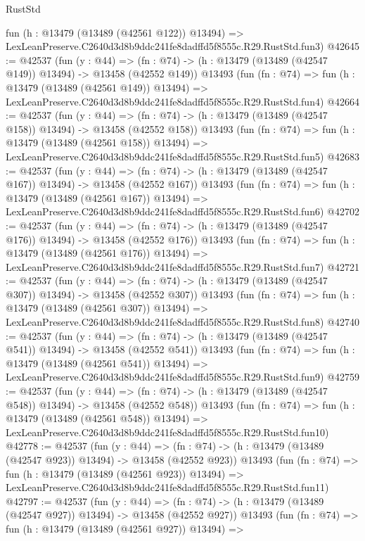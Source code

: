 \begin{lexlean}{RustStd}
\begin{coremodule}
    fun (h : @13479 (@13489 (@42561 @122)) @13494) =>
    LexLeanPreserve.C2640d3d8b9ddc241fe8dadffd5f8555c.R29.RustStd.fun3)
@42645 := @42537
    (fun (y : @44) =>
    (fn : @74) -> (h : @13479 (@13489 (@42547 @149)) @13494) -> @13458 (@42552 @149))
    @13493
    (fun (fn : @74) =>
    fun (h : @13479 (@13489 (@42561 @149)) @13494) =>
    LexLeanPreserve.C2640d3d8b9ddc241fe8dadffd5f8555c.R29.RustStd.fun4)
@42664 := @42537
    (fun (y : @44) =>
    (fn : @74) -> (h : @13479 (@13489 (@42547 @158)) @13494) -> @13458 (@42552 @158))
    @13493
    (fun (fn : @74) =>
    fun (h : @13479 (@13489 (@42561 @158)) @13494) =>
    LexLeanPreserve.C2640d3d8b9ddc241fe8dadffd5f8555c.R29.RustStd.fun5)
@42683 := @42537
    (fun (y : @44) =>
    (fn : @74) -> (h : @13479 (@13489 (@42547 @167)) @13494) -> @13458 (@42552 @167))
    @13493
    (fun (fn : @74) =>
    fun (h : @13479 (@13489 (@42561 @167)) @13494) =>
    LexLeanPreserve.C2640d3d8b9ddc241fe8dadffd5f8555c.R29.RustStd.fun6)
@42702 := @42537
    (fun (y : @44) =>
    (fn : @74) -> (h : @13479 (@13489 (@42547 @176)) @13494) -> @13458 (@42552 @176))
    @13493
    (fun (fn : @74) =>
    fun (h : @13479 (@13489 (@42561 @176)) @13494) =>
    LexLeanPreserve.C2640d3d8b9ddc241fe8dadffd5f8555c.R29.RustStd.fun7)
@42721 := @42537
    (fun (y : @44) =>
    (fn : @74) -> (h : @13479 (@13489 (@42547 @307)) @13494) -> @13458 (@42552 @307))
    @13493
    (fun (fn : @74) =>
    fun (h : @13479 (@13489 (@42561 @307)) @13494) =>
    LexLeanPreserve.C2640d3d8b9ddc241fe8dadffd5f8555c.R29.RustStd.fun8)
@42740 := @42537
    (fun (y : @44) =>
    (fn : @74) -> (h : @13479 (@13489 (@42547 @541)) @13494) -> @13458 (@42552 @541))
    @13493
    (fun (fn : @74) =>
    fun (h : @13479 (@13489 (@42561 @541)) @13494) =>
    LexLeanPreserve.C2640d3d8b9ddc241fe8dadffd5f8555c.R29.RustStd.fun9)
@42759 := @42537
    (fun (y : @44) =>
    (fn : @74) -> (h : @13479 (@13489 (@42547 @548)) @13494) -> @13458 (@42552 @548))
    @13493
    (fun (fn : @74) =>
    fun (h : @13479 (@13489 (@42561 @548)) @13494) =>
    LexLeanPreserve.C2640d3d8b9ddc241fe8dadffd5f8555c.R29.RustStd.fun10)
@42778 := @42537
    (fun (y : @44) =>
    (fn : @74) -> (h : @13479 (@13489 (@42547 @923)) @13494) -> @13458 (@42552 @923))
    @13493
    (fun (fn : @74) =>
    fun (h : @13479 (@13489 (@42561 @923)) @13494) =>
    LexLeanPreserve.C2640d3d8b9ddc241fe8dadffd5f8555c.R29.RustStd.fun11)
@42797 := @42537
    (fun (y : @44) =>
    (fn : @74) -> (h : @13479 (@13489 (@42547 @927)) @13494) -> @13458 (@42552 @927))
    @13493
    (fun (fn : @74) =>
    fun (h : @13479 (@13489 (@42561 @927)) @13494) =>

\end{coremodule}
\end{lexlean}
